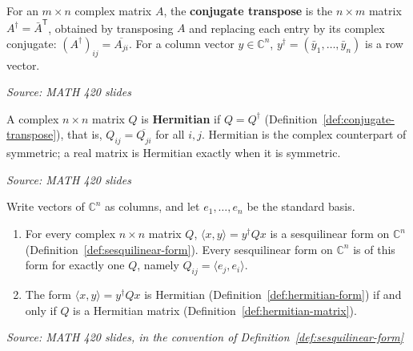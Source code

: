 \documentclass[11pt]{report}
\newcommand{\srcline}[1]{\par\hfill{\footnotesize\textit{Source: #1}}}
\begin{document}
\begin{defbox}\label{def:conjugate-transpose}
For an $m \times n$ complex matrix $A$, the \textbf{conjugate transpose} is the $n \times m$ matrix $A^\dagger = \bar A^{\mathsf{T}}$, obtained by transposing $A$ and replacing each entry by its complex conjugate: $(A^\dagger)_{ij} = \overline{A_{ji}}$. For a column vector $y \in \mathbb{C}^n$, $y^\dagger = (\bar y_1, \ldots, \bar y_n)$ is a row vector.
\srcline{MATH 420 slides}
\end{defbox}

\begin{defbox}\label{def:hermitian-matrix}
A complex $n \times n$ matrix $Q$ is \textbf{Hermitian} if $Q = Q^\dagger$ (Definition~\ref{def:conjugate-transpose}), that is, $Q_{ij} = \overline{Q_{ji}}$ for all $i, j$. Hermitian is the complex counterpart of symmetric; a real matrix is Hermitian exactly when it is symmetric.
\srcline{MATH 420 slides}
\end{defbox}

\begin{propbox}\label{prop:sesquilinear-matrix}
Write vectors of $\mathbb{C}^n$ as columns, and let $e_1, \ldots, e_n$ be the standard basis.
\begin{enumerate}
    \item For every complex $n \times n$ matrix $Q$, $\langle x, y \rangle = y^\dagger Q x$ is a sesquilinear form on $\mathbb{C}^n$ (Definition~\ref{def:sesquilinear-form}). Every sesquilinear form on $\mathbb{C}^n$ is of this form for exactly one $Q$, namely $Q_{ij} = \langle e_j, e_i \rangle$.
    \item The form $\langle x, y \rangle = y^\dagger Q x$ is Hermitian (Definition~\ref{def:hermitian-form}) if and only if $Q$ is a Hermitian matrix (Definition~\ref{def:hermitian-matrix}).
\end{enumerate}
\srcline{MATH 420 slides, in the convention of Definition~\ref{def:sesquilinear-form}}
\end{propbox}
\end{document}
